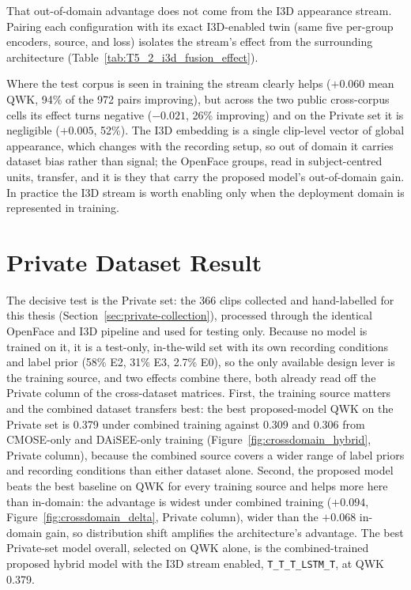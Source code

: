 \documentclass[../main.tex]{subfiles}
\begin{document}
That out-of-domain advantage does not come from the I3D appearance stream. Pairing each configuration with its exact I3D-enabled twin (same five per-group encoders, source, and loss) isolates the stream's effect from the surrounding architecture (Table~\ref{tab:T5_2_i3d_fusion_effect}).

Where the test corpus is seen in training the stream clearly helps ($+0.060$ mean QWK, 94\% of the 972 pairs improving), but across the two public cross-corpus cells its effect turns negative ($-0.021$, 26\% improving) and on the Private set it is negligible ($+0.005$, 52\%). The I3D embedding is a single clip-level vector of global appearance, which changes with the recording setup, so out of domain it carries dataset bias rather than signal; the OpenFace groups, read in subject-centred units, transfer, and it is they that carry the proposed model's out-of-domain gain. In practice the I3D stream is worth enabling only when the deployment domain is represented in training.

\FloatBarrier
\section{Private Dataset Result}
\label{sec:private-result}

The decisive test is the Private set: the 366 clips collected and hand-labelled for this thesis (Section~\ref{sec:private-collection}), processed through the identical OpenFace and I3D pipeline and used for testing only. Because no model is trained on it, it is a test-only, in-the-wild set with its own recording conditions and label prior (58\% E2, 31\% E3, 2.7\% E0), so the only available design lever is the training source, and two effects combine there, both already read off the Private column of the cross-dataset matrices. First, the training source matters and the combined dataset transfers best: the best proposed-model QWK on the Private set is 0.379 under combined training against 0.309 and 0.306 from CMOSE-only and DAiSEE-only training (Figure~\ref{fig:crossdomain_hybrid}, Private column), because the combined source covers a wider range of label priors and recording conditions than either dataset alone. Second, the proposed model beats the best baseline on QWK for every training source and helps more here than in-domain: the advantage is widest under combined training ($+0.094$, Figure~\ref{fig:crossdomain_delta}, Private column), wider than the $+0.068$ in-domain gain, so distribution shift amplifies the architecture's advantage. The best Private-set model overall, selected on QWK alone, is the combined-trained proposed hybrid model with the I3D stream enabled, \texttt{T\_T\_T\_LSTM\_T}, at QWK 0.379.
\end{document}
